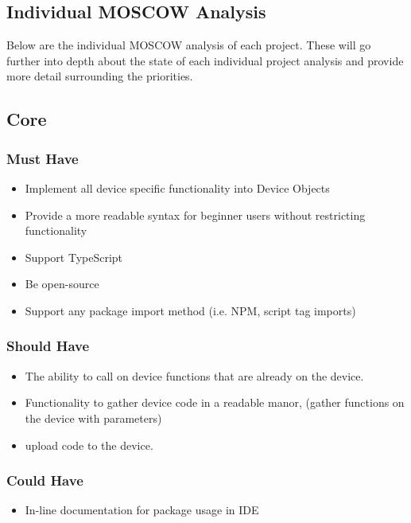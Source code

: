 \documentclass{l4proj}
\begin{document}
%
% 

\begin{appendices}
\chapter{Individual MOSCOW Analysis}

\label{appendix:MOSCOWAnalysis}

Below are the individual MOSCOW analysis of each project. These will go further into depth about the state of each individual project analysis and provide more detail surrounding the priorities.


\section{Core}
\subsection{Must Have}
\begin{itemize}
    \item Implement all device specific functionality into Device Objects
    \item Provide a more readable syntax for beginner users without restricting functionality
    \item Support TypeScript
    \item Be open-source
    \item Support any package import method (i.e. NPM, script tag imports)
\end{itemize}
\subsection{Should Have}
\begin{itemize}
    \item The ability to call on device functions that are already on the device.
    \item Functionality to gather device code in a readable manor, (gather functions on the device with parameters)
    \item upload code to the device.
\end{itemize}
\subsection{Could Have}
\begin{itemize}
    \item In-line documentation for package usage in IDE
\end{itemize}


\end{appendices}
\end{document}
